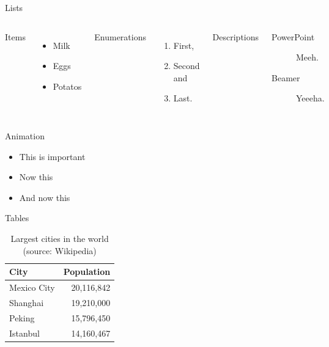 \documentclass[12pt]{beamer}
\begin{document}
\begin{frame}{Lists}
  \begin{columns}[T,onlytextwidth]
      Items
      \begin{itemize}
        \item Milk \item Eggs \item Potatos
      \end{itemize}

      Enumerations
      \begin{enumerate}
        \item First, \item Second and \item Last.
      \end{enumerate}

      Descriptions
      \begin{description}
        \item[PowerPoint] Meeh. \item[Beamer] Yeeeha.
      \end{description}
  \end{columns}
\end{frame}
\begin{frame}{Animation}
  \begin{itemize}[<+- | alert@+>]
    \item \alert<4>{This is important}
    \item Now this
    \item And now this
  \end{itemize}
\end{frame}
\begin{frame}{Tables}
  \begin{table}
    \caption{Largest cities in the world (source: Wikipedia)}
    \begin{tabular}{lr}
      \toprule
      City & Population\\
      \midrule
      Mexico City & 20,116,842\\
      Shanghai & 19,210,000\\
      Peking & 15,796,450\\
      Istanbul & 14,160,467\\
      \bottomrule
    \end{tabular}
  \end{table}
\end{frame}
\end{document}
